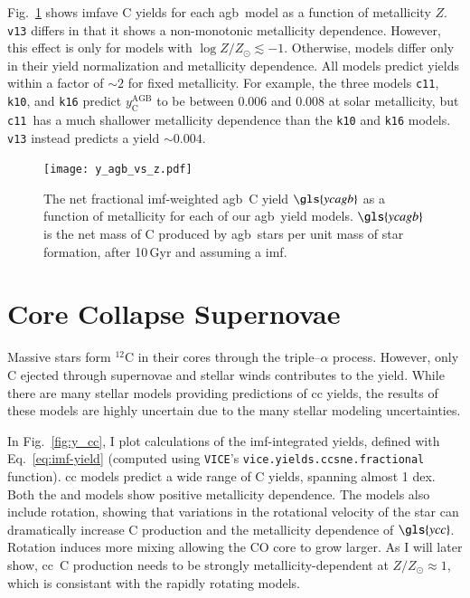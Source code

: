\documentclass[12pt,oneside,letterpaper]{report}
\newcommand{\cc}{\gls{cc}}
\newcommand{\agb}{\gls{agb}}
\newcommand{\imf}{\gls{imf}}
\newcommand{\cxi}{\texttt{\gls{c11}}}
\newcommand{\kx}{\texttt{\gls{k10}}}
\newcommand{\kxvi}{\texttt{\gls{k16}}}
\newcommand{\vxiii}{\texttt{\gls{v13}}}
\newcommand{\Ycc}{\gls{ycc}}
\newcommand{\Ycagb}{\gls{ycagb}}
\newcommand{\VICE}{\texttt{VICE}}
\newcommand{\about}[1]{${\sim} #1$}
\begin{document}
Fig.~\ref{fig:yagb-z} shows \gls{imfave} C yields for each \agb\ model as a function of metallicity $Z$.
\vxiii{} differs in that it shows a non-monotonic metallicity dependence. However, this effect is only for models with $\log Z/Z_\odot \lesssim -1$.
Otherwise, models differ only in their yield normalization and metallicity dependence. All models predict yields within a factor of \about{2} for fixed metallicity.
For example, the three models \cxi, \kx{}, and \kxvi{} predict $y_\text{C}^\text{AGB}$ to be between 0.006 and 0.008 at solar metallicity, but \cxi\ has a much shallower metallicity dependence than the \kx{} and \kxvi{} models. \vxiii{} instead predicts a yield \about{0.004}.

\begin{figure}[htp]
    \centering
    \texttt{[image: y\_agb\_vs\_z.pdf]}

    \caption[Low mass yield metallicity dependence]{The net fractional \imf-weighted \agb\ C yield $\Ycagb$ as a function of metallicity for each of our \agb\ yield models. $\Ycagb$ is the net mass of C produced by \agb\ stars per unit mass of star formation, after 10\,Gyr and assuming a \citet{kroupa01} \imf.
    }
    \label{fig:yagb-z}
\end{figure}

\section{Core Collapse Supernovae}


Massive stars form $^{12}$C in their cores through the triple--$\alpha$ process. However, only C ejected through supernovae and stellar winds contributes to the yield. 
While there are many stellar models providing predictions of \cc{} yields, the results of these models are highly uncertain due to the many stellar modeling uncertainties. 

In Fig.~\ref{fig:y_cc}, I plot calculations of the \imf-integrated yields, defined with Eq.~\ref{eq:imf-yield} (computed using \VICE's \texttt{vice.yields.ccsne.fractional} function). 
\cc{} models predict a wide range of C yields, spanning almost 1 dex. 
Both the \citet{NKT13} and \cite{LC18} models show positive metallicity dependence. 
The \cite{LC18} models also include rotation, showing that variations in the rotational velocity of the star can dramatically increase C production and the metallicity dependence of $\Ycc$. Rotation induces more mixing allowing the CO core to grow larger. As I will later show, \cc\ C production needs to be strongly metallicity-dependent at $Z/Z_\odot \approx 1$, which is consistant with the \cite{LC18} rapidly rotating models.
\end{document}
